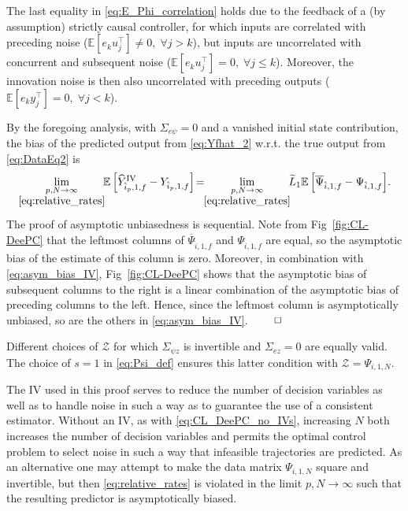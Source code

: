 The last equality in \eqref{eq:E_Phi_correlation} holds due to the feedback of a (by assumption) strictly causal controller, for which inputs are correlated with preceding noise (${\mathbb{E}[e_k u_j^\top]\neq0,\; \forall j>k}$), but inputs are uncorrelated with concurrent and subsequent noise (${\mathbb{E}[e_k u_j^\top]=0,\; \forall j\leq k}$). Moreover, the innovation noise is then also uncorrelated with preceding outputs (${\mathbb{E}[e_k y_j^\top]=0,\; \forall j<k}$).

By the foregoing analysis, with $\Sigma_{e\psi}=0$ and a vanished initial state contribution, the bias of the predicted output from \eqref{eq:Yfhat_2} w.r.t. the true output from \eqref{eq:DataEq2} is
\begin{align}\label{eq:asym_bias_IV}
    \lim_{\underset{\eqref{eq:relative_rates}}{p,N\rightarrow\infty}}\!\!\mathbb{E}\left[\widehat{Y}_{\hat{i}_p,1,f}^\mathrm{IV}-Y_{\hat{i}_p,1,f}\right]\!=\!\!\lim_{\underset{\eqref{eq:relative_rates}}{p,N\rightarrow\infty}}\!\!\widetilde{L}_1\mathbb{E}\left[\overline{\Psi}_{\hat{i},1,f}-\Psi_{\hat{i},1,f}\right]\!.
\end{align}
The proof of asymptotic unbiasedness is sequential. Note from Fig~\ref{fig:CL-DeePC} that the leftmost columns of $\overline{\Psi}_{\hat{i},1,f}$ and $\Psi_{\hat{i},1,f}$ are equal, so the asymptotic bias of the estimate of this column is zero. Moreover, in combination with \eqref{eq:asym_bias_IV}, Fig~\ref{fig:CL-DeePC} shows that the asymptotic bias of subsequent columns to the right is a linear combination of the asymptotic bias of preceding columns to the left. Hence, since the leftmost column is asymptotically unbiased, so are the others in \eqref{eq:asym_bias_IV}. $\hfill\qed$
\setcounter{thm}{0}
\begin{rem}
    Different choices of $\mathcal{Z}$ for which $\Sigma_{\psi z}$ is invertible and $\Sigma_{ez}=0$ are equally valid. The choice of $s=1$ in \eqref{eq:Psi_def} ensures this latter condition with $\mathcal{Z}=\Psi_{i,1,N}$.
\end{rem}
\begin{rem}
    The \ac{IV} used in this proof serves to reduce the number of decision variables as well as to handle noise in such a way as to guarantee the use of a consistent estimator. Without an \ac{IV}, as with \eqref{eq:CL_DeePC_no_IVs}, increasing $N$ both increases the number of decision variables and permits the optimal control problem to select noise in such a way that infeasible trajectories are predicted. As an alternative one may attempt to make the data matrix $\Psi_{i,1,N}$ square and invertible, but then \eqref{eq:relative_rates} is violated in the limit $p,N\rightarrow\infty$ such that the resulting predictor is asymptotically biased.
\end{rem}